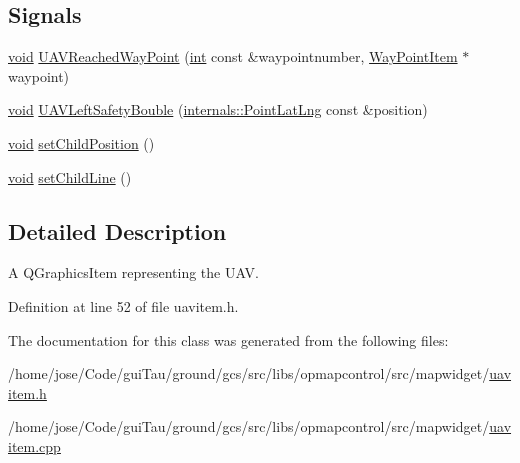 \subsection*{Signals}
\begin{DoxyCompactItemize}
\item 
\hyperlink{group___u_a_v_objects_plugin_ga444cf2ff3f0ecbe028adce838d373f5c}{void} \hyperlink{group___o_p_map_widget_gabf2d7a7d3651230d841d2d0e2477bcad}{U\-A\-V\-Reached\-Way\-Point} (\hyperlink{ioapi_8h_a787fa3cf048117ba7123753c1e74fcd6}{int} const \&waypointnumber, \hyperlink{classmapcontrol_1_1_way_point_item}{Way\-Point\-Item} $\ast$waypoint)
\item 
\hyperlink{group___u_a_v_objects_plugin_ga444cf2ff3f0ecbe028adce838d373f5c}{void} \hyperlink{group___o_p_map_widget_ga845584d53f92c89f8f657d7d13630187}{U\-A\-V\-Left\-Safety\-Bouble} (\hyperlink{structinternals_1_1_point_lat_lng}{internals\-::\-Point\-Lat\-Lng} const \&position)
\item 
\hyperlink{group___u_a_v_objects_plugin_ga444cf2ff3f0ecbe028adce838d373f5c}{void} \hyperlink{group___o_p_map_widget_ga68e3f8435620e746ad771a99666216dc}{set\-Child\-Position} ()
\item 
\hyperlink{group___u_a_v_objects_plugin_ga444cf2ff3f0ecbe028adce838d373f5c}{void} \hyperlink{group___o_p_map_widget_gafcbd9466c92579c43c5be53eaca75147}{set\-Child\-Line} ()
\end{DoxyCompactItemize}


\subsection{Detailed Description}
A Q\-Graphics\-Item representing the U\-A\-V. 

Definition at line 52 of file uavitem.\-h.



The documentation for this class was generated from the following files\-:\begin{DoxyCompactItemize}
\item 
/home/jose/\-Code/gui\-Tau/ground/gcs/src/libs/opmapcontrol/src/mapwidget/\hyperlink{uavitem_8h}{uavitem.\-h}\item 
/home/jose/\-Code/gui\-Tau/ground/gcs/src/libs/opmapcontrol/src/mapwidget/\hyperlink{uavitem_8cpp}{uavitem.\-cpp}\end{DoxyCompactItemize}
